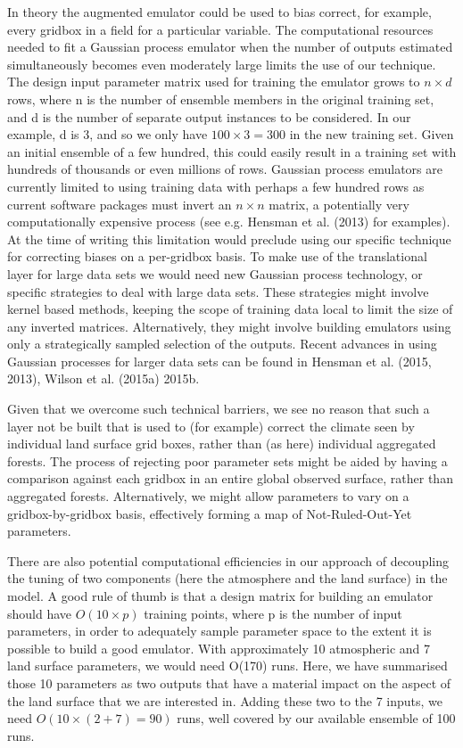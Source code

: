 \documentclass[gmd, manuscript]{copernicus}
\begin{document}
In theory the augmented emulator could be used to bias correct, for example, every gridbox in a field for a particular variable. The computational resources needed to fit a Gaussian process emulator when the number of outputs estimated simultaneously becomes even moderately large limits the use of our technique. The design input parameter matrix used for training the emulator grows to $n \times d$ rows, where n is the number of ensemble members in the original training set, and d is the number of separate output instances to be considered. In our example, d is 3, and so we only have $100 \times 3 = 300$ in the new training set. Given an initial ensemble of a few hundred, this could easily result in a training set with hundreds of thousands or even millions of rows. Gaussian process emulators are currently limited to using training data with perhaps a few hundred rows as current software packages must invert an $n \times n$ matrix, a potentially very computationally expensive process (see e.g. Hensman et al. (2013) for examples). At the time of writing this limitation would preclude using our specific technique for correcting biases on a per-gridbox basis. To make use of the translational layer for large data sets we would need new Gaussian process technology, or specific strategies to deal with large data sets. These strategies might involve kernel based methods, keeping the scope of training data local to limit the size of any inverted matrices. Alternatively, they might involve building emulators using only a strategically sampled selection of the outputs. Recent advances in using Gaussian processes for larger data sets can be found in Hensman et al. (2015, 2013),  Wilson et al. (2015a) 2015b.

Given that we overcome such technical barriers, we see no reason that such a layer not be built that is used to (for example) correct the climate seen by individual land surface grid boxes, rather than (as here) individual aggregated forests. The process of rejecting poor parameter sets might be aided by having a comparison against each gridbox in an entire global observed surface, rather than aggregated forests. Alternatively, we might allow parameters to vary on a gridbox-by-gridbox basis, effectively forming a map of Not-Ruled-Out-Yet parameters. 

There are also potential computational efficiencies in our approach of decoupling the tuning of two components (here the atmosphere and the land surface) in the model. A good rule of thumb is that a design matrix for building an emulator should have $O(10 \times p)$ training points, where p is the number of input parameters, in order to adequately sample parameter space to the extent it is possible to build a good emulator. With approximately 10 atmospheric and 7 land surface parameters, we would need O(170) runs. Here, we have summarised those 10 parameters as two outputs that have a material impact on the aspect of the land surface that we are interested in. Adding these two to the 7 inputs, we need $O(10 \times (2+7) = 90)$ runs, well covered by our available ensemble of 100 runs. 
\end{document}
